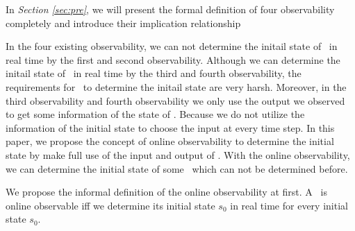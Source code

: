 
In {\em Section \ref{sec:pre}}, we will present the formal definition of four observability completely and introduce their implication relationship%

In the four existing observability, we can not determine the initail state of \BCNs\ in real time by the first and second observability. Although we can determine the initail state of \BCNs\ in real time by the third and fourth observability, the requirements for \BCNs\ to determine the initail state are very harsh. Moreover, in the third observability and fourth observability we only use the output we observed to get some information of the state of \BCNs. Because we do not utilize the information of the initial state to choose the input at every time step. In this paper, we propose the concept of online observability to determine the initial state by make full use of the input and output of \BCNs. With the online observability, we can determine the initial state of some \BCNs\ which can not be determined before.

We propose the informal definition of the online observability at first.  A \BCN\ is online observable iff we determine its initial state $s_0$ in real time for every initial state $s_0$.

